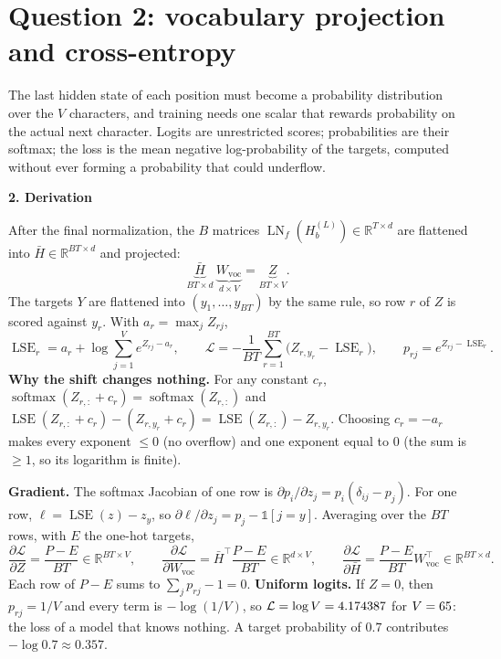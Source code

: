 \documentclass[11pt,a4paper]{article}
\numberwithin{equation}{section}
\newcommand{\R}{\mathbb{R}}
\newcommand{\T}{^{\top}}
\newcommand{\LN}{\operatorname{LN}}
\newcommand{\LSE}{\operatorname{LSE}}
\newcommand{\softmax}{\operatorname{softmax}}
\newcommand{\Wvoc}{W_{\mathrm{voc}}}
\newcommand{\Hbar}{\bar H}
\newcommand{\stephead}[1]{\par\smallskip\noindent\textbf{\small #1}\par\nobreak}
\begin{document}
\section{Question 2: vocabulary projection and cross-entropy}\label{sec:q2}

\begin{purpose}
The last hidden state of each position must become a probability distribution over the $V$ characters, and training needs
one scalar that rewards probability on the actual next character. Logits are unrestricted scores; probabilities are their
softmax; the loss is the mean negative log-probability of the targets, computed without ever forming a probability that
could underflow.
\end{purpose}

\stephead{2. Derivation}
After the final normalization, the $B$ matrices $\LN_f(H_b^{(L)})\in\R^{T\times d}$ are flattened into $\Hbar\in\R^{BT\times d}$
and projected:
\begin{equation}
\underbrace{\Hbar}_{BT\times d}\ \underbrace{\Wvoc}_{d\times V}=\underbrace{Z}_{BT\times V} .
\end{equation}
The targets $Y$ are flattened into $(y_1,\dots,y_{BT})$ by the same rule, so row $r$ of $Z$ is scored against $y_r$. With
$a_r=\max_jZ_{rj}$,
\begin{equation}
\LSE_r=a_r+\log\sum_{j=1}^Ve^{Z_{rj}-a_r},\qquad
\mathcal L=-\frac1{BT}\sum_{r=1}^{BT}\big(Z_{r,y_r}-\LSE_r\big),\qquad p_{rj}=e^{Z_{rj}-\LSE_r}.
\end{equation}
\textbf{Why the shift changes nothing.} For any constant $c_r$, $\softmax(Z_{r,:}+c_r)=\softmax(Z_{r,:})$ and
$\LSE(Z_{r,:}+c_r)-(Z_{r,y_r}+c_r)=\LSE(Z_{r,:})-Z_{r,y_r}$. Choosing $c_r=-a_r$ makes every exponent $\le0$ (no overflow) and
one exponent equal to $0$ (the sum is $\ge1$, so its logarithm is finite).

\textbf{Gradient.} The softmax Jacobian of one row is $\partial p_i/\partial z_j=p_i(\delta_{ij}-p_j)$. For one row,
$\ell=\LSE(z)-z_y$, so $\partial\ell/\partial z_j=p_j-\mathbb 1[j=y]$. Averaging over the $BT$ rows, with $E$ the one-hot
targets,
\begin{equation}
\frac{\partial\mathcal L}{\partial Z}=\frac{P-E}{BT}\in\R^{BT\times V},\qquad
\frac{\partial\mathcal L}{\partial\Wvoc}=\Hbar\T\frac{P-E}{BT}\in\R^{d\times V},\qquad
\frac{\partial\mathcal L}{\partial\Hbar}=\frac{P-E}{BT}\Wvoc\T\in\R^{BT\times d}.
\end{equation}
Each row of $P-E$ sums to $\sum_jp_{rj}-1=0$. \textbf{Uniform logits.} If $Z=0$, then $p_{rj}=1/V$ and every term is
$-\log(1/V)$, so $\mathcal L=\log V=4.174387$ for $V=65$: the loss of a model that knows nothing. A target probability of
$0.7$ contributes $-\log0.7\approx0.357$.
\end{document}
